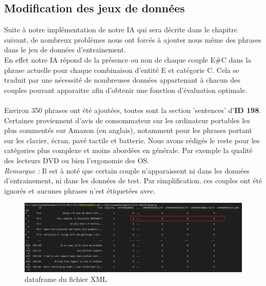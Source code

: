 \documentclass[12pt ,a4paper ]{article}
\begin{document}
\begin{multicols}{2}
\subsection{Modification des jeux de données}
Suite à notre implémentation de notre IA qui sera décrite dans le chapitre suivant, de nombreux problèmes nous ont forcés à ajouter nous même des phrases dans le jeu de données d'entrainement.\\

En effet notre IA répond de la présence ou non de chaque couple E\#C dans la phrase actuelle pour chaque combinaison d'entité E et catégorie C. Cela se traduit par une nécessité de nombreuses données appartenant à chacun des couples pouvant apparaitre afin d'obtenir une fonction d'évaluation optimale. 

\paragraph{}
\noindent Environ 350 phrases ont été ajoutées, toutes sont la section 'sentences' d'\textbf{ID 198}. Certaines proviennent d'avis de consommateur sur les ordinateur portables les plus commentés sur Amazon (en anglais), notamment pour les phrases portant sur les clavier, écran, pavé tactile et batterie. Nous avons rédigés le reste pour les catégories plus complexe et moins abordées en générale. Par exemple la qualité des lecteurs DVD ou bien l'ergonomie des OS. \\ 

\noindent \textit{Remarque : } Il est à noté que certain couple n'apparaissent ni dans les données d'entrainement, ni dans les données de test. Par simplification, ces couples ont été ignorés et aucunes phrases n'est étiquetées avec.

\begin{figure}[ht]
    \begin{center}
        \includegraphics[width=1\textwidth]{first_dataf.png}
    \end{center}
\caption{\small{dataframe du fichier XML}}
\end{figure}


\end{multicols}
\end{document}
